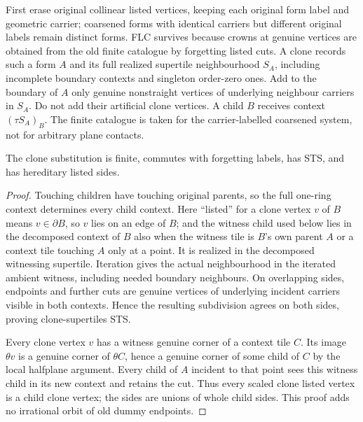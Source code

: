 \begin{definition}\label{def:clones}
First erase original collinear listed vertices, keeping each original form
label and geometric carrier; coarsened forms with identical carriers but
different original labels remain distinct forms. FLC survives because crowns at genuine vertices
are obtained from the old finite catalogue by forgetting listed cuts.
A clone records such a form $A$ and its full realized supertile neighbourhood
$S_A$, including incomplete boundary contexts and singleton order-zero ones.
Add to the boundary of $A$ only genuine nonstraight vertices of underlying
neighbour carriers in $S_A$. Do not add their artificial clone vertices.
A child $B$ receives context $(\tau S_A)_B$. The finite catalogue is taken
for the carrier-labelled coarsened system, not for arbitrary plane contacts.
\end{definition}

\begin{lemma}\label{lem:clone-sts}
The clone substitution is finite, commutes with forgetting labels, has STS,
and has hereditary listed sides.
\end{lemma}
\begin{proof}
Touching children have touching original parents, so the full one-ring
context determines every child context. Here ``listed'' for a clone vertex
$v$ of $B$ means $v\in\partial B$, so $v$ lies on an edge of $B$; and the
witness child used below lies in the decomposed context of $B$ also when
the witness tile is $B$'s own parent $A$ or a context tile touching $A$
only at a point. It is realized in the decomposed
witnessing supertile. Iteration gives the actual neighbourhood in the
iterated ambient witness, including needed boundary neighbours.
On overlapping sides, endpoints and further cuts are genuine vertices of
underlying incident carriers visible in both contexts. Hence the resulting
subdivision agrees on both sides, proving clone-supertiles STS.

Every clone vertex $v$ has a witness genuine corner of a context tile $C$.
Its image $\theta v$ is a genuine corner of $\theta C$, hence a genuine
corner of some child of $C$ by the local halfplane argument. Every child of
$A$ incident to that point sees this witness child in its new context and
retains the cut. Thus every scaled clone listed vertex is a child clone
vertex; the sides are unions of whole child sides. This proof adds no
irrational orbit of old dummy endpoints.
\end{proof}

